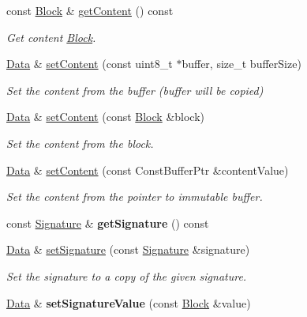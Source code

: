 \begin{DoxyCompactItemize}
\item 
const \hyperlink{classndn_1_1Block}{Block} \& \hyperlink{classndn_1_1Data_a4625b6e020424ace77fcc6bf7e67a46b}{get\+Content} () const
\begin{DoxyCompactList}\small\item\em Get content \hyperlink{classndn_1_1Block}{Block}. \end{DoxyCompactList}\item 
\hyperlink{classndn_1_1Data}{Data} \& \hyperlink{classndn_1_1Data_a890a28a89b5c5a87ed6ffbb0fe46819d}{set\+Content} (const uint8\+\_\+t $\ast$buffer, size\+\_\+t buffer\+Size)
\begin{DoxyCompactList}\small\item\em Set the content from the buffer (buffer will be copied) \end{DoxyCompactList}\item 
\hyperlink{classndn_1_1Data}{Data} \& \hyperlink{classndn_1_1Data_a12b67c635114f0caae2ba467be81916e}{set\+Content} (const \hyperlink{classndn_1_1Block}{Block} \&block)
\begin{DoxyCompactList}\small\item\em Set the content from the block. \end{DoxyCompactList}\item 
\hyperlink{classndn_1_1Data}{Data} \& \hyperlink{classndn_1_1Data_a0b0e17153731d21fae26cdb1b4c9baa5}{set\+Content} (const Const\+Buffer\+Ptr \&content\+Value)
\begin{DoxyCompactList}\small\item\em Set the content from the pointer to immutable buffer. \end{DoxyCompactList}\item 
const \hyperlink{classndn_1_1Signature}{Signature} \& {\bfseries get\+Signature} () const\hypertarget{classndn_1_1Data_a9b429825372814fc931764167fc6412b}{}\label{classndn_1_1Data_a9b429825372814fc931764167fc6412b}

\item 
\hyperlink{classndn_1_1Data}{Data} \& \hyperlink{classndn_1_1Data_add0d2d3b0f12a3f2af9ab3a01c8edb4e}{set\+Signature} (const \hyperlink{classndn_1_1Signature}{Signature} \&signature)
\begin{DoxyCompactList}\small\item\em Set the signature to a copy of the given signature. \end{DoxyCompactList}\item 
\hyperlink{classndn_1_1Data}{Data} \& {\bfseries set\+Signature\+Value} (const \hyperlink{classndn_1_1Block}{Block} \&value)\hypertarget{classndn_1_1Data_a6b8c466508f3babf62403e01c4f7c376}{}\label{classndn_1_1Data_a6b8c466508f3babf62403e01c4f7c376}


\end{DoxyCompactItemize}
